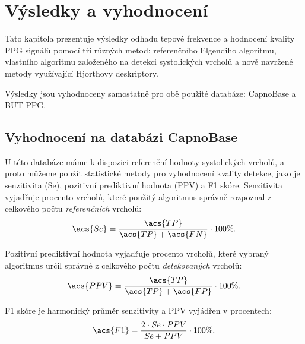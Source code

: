 \chapter{Výsledky a vyhodnocení}
\label{ch:vysledky}
Tato kapitola prezentuje výsledky odhadu tepové frekvence a hodnocení kvality PPG signálů pomocí tří různých metod:
referenčního Elgendiho algoritmu, vlastního algoritmu založeného na detekci systolických vrcholů a nově navržené metody využívající Hjorthovy deskriptory.

Výsledky jsou vyhodnoceny samostatně pro obě použité databáze: CapnoBase a \acl{BUT PPG}.

\section{Vyhodnocení na databázi CapnoBase}
\label{sec:vysledky_capnobase}
U této databáze máme k dispozici referenční hodnoty systolických vrcholů, a proto můžeme použít statistické metody pro vyhodnocení kvality detekce, jako je senzitivita (\acs{Se}), pozitivní prediktivní hodnota (\acs{PPV}) a F1 skóre.
Senzitivita vyjadřuje procento vrcholů, které použitý algoritmus správně rozpoznal z celkového počtu \textit{referenčních} vrcholů:
\begin{equation}
	\label{eq:se}
	\acs{Se} = \frac{\acs{TP}}{\acs{TP} + \acs{FN}} \cdot 100\%.
\end{equation}

Pozitivní prediktivní hodnota vyjadřuje procento vrcholů, které vybraný algoritmus určil správně z celkového počtu \textit{detekovaných} vrcholů:
\begin{equation}
	\label{eq:ppv}
	\acs{PPV} = \frac{\acs{TP}}{\acs{TP} + \acs{FP}} \cdot 100\%.
\end{equation}

\acs{F1} skóre je harmonický průměr senzitivity a \acs{PPV} vyjádřen v procentech:
\begin{equation}
	\label{eq:f1}
	\acs{F1} = \frac{2 \cdot Se \cdot PPV}{Se + PPV} \cdot 100\%.
\end{equation}

